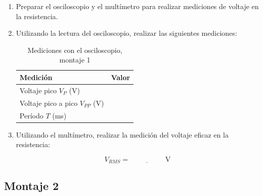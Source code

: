 \documentclass{article}
\newcommand{\vacio}[1][2cm]{\underline{\hspace{#1}}}
\begin{document}
\begin{enumerate}
        \item Preparar el osciloscopio y el multímetro para realizar mediciones de voltaje en la resistencia.


        \item Utilizando la lectura del osciloscopio, realizar las siguientes mediciones:

        \begin{table}[ht!]
            \centering
            \begin{tabular}{lc}
                \toprule
                Medición                         & Valor  \\
                \midrule
                Voltaje pico $V_P$ (V)           & \vacio \\
                Voltaje pico a pico $V_{PP}$ (V) & \vacio \\
                Período $T$ (ms)                 & \vacio \\
                \bottomrule
            \end{tabular}
            \caption{Mediciones con el osciloscopio, montaje 1}\label{tab:osc-m1}
        \end{table}

        \item Utilizando el multímetro, realizar la medición del voltaje eficaz en la resistencia:

        \[
            V_{RMS} = \vacio\ \si{\volt}
        \]
    \end{enumerate}

    \subsection{Montaje 2}
\end{document}
